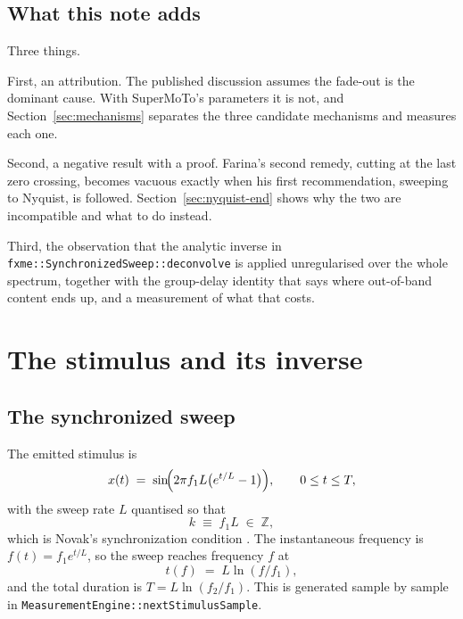 \documentclass[11pt,a4paper]{article}
\newcommand{\code}[1]{\texttt{\small #1}}
\begin{document}
\subsection{What this note adds}

Three things.

First, an attribution. The published discussion assumes the fade-out is the
dominant cause. With SuperMoTo's parameters it is not, and
Section~\ref{sec:mechanisms} separates the three candidate mechanisms and
measures each one.

Second, a negative result with a proof. Farina's second remedy, cutting at the
last zero crossing, becomes vacuous exactly when his first recommendation,
sweeping to Nyquist, is followed. Section~\ref{sec:nyquist-end} shows why the
two are incompatible and what to do instead.

Third, the observation that the analytic inverse in
\code{fxme::SynchronizedSweep::deconvolve} is applied unregularised over the
whole spectrum, together with the group-delay identity that says where
out-of-band content ends up, and a measurement of what that costs.

\section{The stimulus and its inverse}
\label{sec:stimulus}

\subsection{The synchronized sweep}

The emitted stimulus is
%
\begin{equation}
  x(t) \;=\; \sin\!\Bigl( 2\pi f_1 L \bigl( e^{t/L} - 1 \bigr) \Bigr),
  \qquad 0 \le t \le T,
  \label{eq:sweep}
\end{equation}
%
with the sweep rate $L$ quantised so that
%
\begin{equation}
  k \;\equiv\; f_1 L \;\in\; \mathbb{Z},
  \label{eq:novak}
\end{equation}
%
which is Novak's synchronization condition \cite{Novak2015}. The instantaneous
frequency is $f(t) = f_1 e^{t/L}$, so the sweep reaches frequency $f$ at
%
\begin{equation}
  t(f) \;=\; L \ln (f/f_1),
  \label{eq:arrival}
\end{equation}
%
and the total duration is $T = L \ln (f_2/f_1)$. This is generated sample by
sample in \code{MeasurementEngine::nextStimulusSample}.
\end{document}
